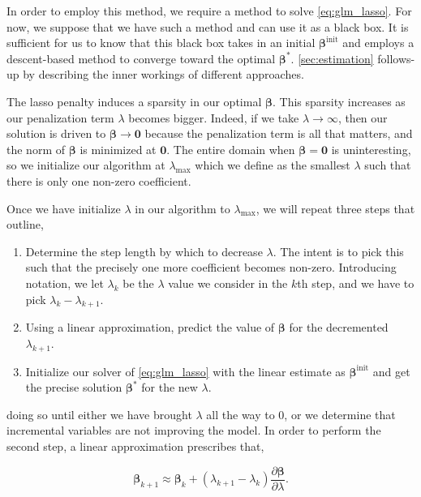 \documentclass[letterpaper, 12pt]{article}
\newcommand{\bbeta}{\bm \beta}
\begin{document}
In order to employ this method, we require a method to solve
\eqref{eq:glm_lasso}. For now, we suppose that we have such a method and can use
it as a black box. It is sufficient for us to know that this black box takes in
an initial $\bbeta^\text{init}$ and employs a descent-based method to converge
toward the optimal $\bbeta^*$. \cref{sec:estimation} follows-up by describing
the inner workings of different approaches.

The lasso penalty induces a sparsity in our optimal $\bbeta$. This sparsity
increases as our penalization term $\lambda$ becomes bigger. Indeed, if we take
$\lambda \to \infty$, then our solution is driven to $\bbeta \to \bm{0}$ because
the penalization term is all that matters, and the norm of $\bbeta$ is minimized
at $\bm{0}$. The entire domain when $\bbeta = \bm{0}$ is uninteresting, so we
initialize our algorithm at $\lambda_\text{max}$ which we define as the smallest
$\lambda$ such that there is only one non-zero coefficient.

Once we have initialize $\lambda$ in our algorithm to $\lambda_\text{max}$, we
will repeat three steps that \cite{park2007l1} outline,

\begin{enumerate}

\item Determine the step length by which to decrease $\lambda$. The intent is to
pick this such that the precisely one more coefficient becomes non-zero.
Introducing notation, we let $\lambda_k$ be the $\lambda$ value we consider in
the $k$th step, and we have to pick $\lambda_k - \lambda_{k+1}$.

\item Using a linear approximation, predict the value of $\bbeta$ for the
decremented $\lambda_{k+1}$.

\item Initialize our solver of \eqref{eq:glm_lasso} with the linear estimate as
$\bbeta^\text{init}$ and get the precise solution $\bbeta^*$ for the new
$\lambda$.

\end{enumerate}

doing so until either we have brought $\lambda$ all the way to 0, or we
determine that incremental variables are not improving the model. In order to
perform the second step, a linear approximation prescribes that,

\[ \bbeta_{k+1} \approx \bbeta_k + (\lambda_{k+1} - \lambda_k) \frac{\partial
\bbeta}{\partial \lambda}.\]
\end{document}
